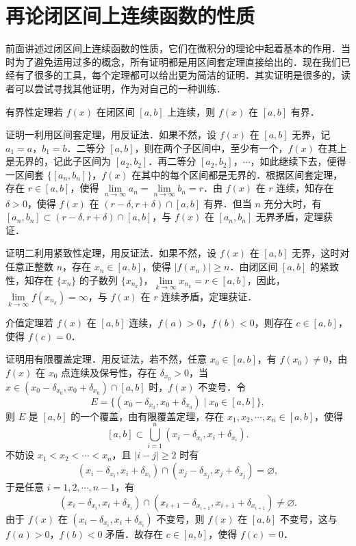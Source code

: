 \section{再论闭区间上连续函数的性质}

前面讲述过闭区间上连续函数的性质，它们在微积分的理论中起着基本的作用．当时为了避免运用过多的概念，所有证明都是用区间套定理直接给出的．现在我们已经有了很多的工具，每个定理都可以给出更为简洁的证明．其实证明是很多的，读者可以尝试寻找其他证明，作为对自己的一种训练．

{\thmheadfont 有界性定理}\quad 若 $f(x)$ 在闭区间 $[a, b]$ 上连续，则 $f(x)$ 在 $[a, b]$ 有界．

{\thmheadfont 证明一}\quad 利用区间套定理，用反证法．如果不然，设 $f(x)$ 在 $[a, b]$ 无界，记 $a_1 = a$，$b_1 = b$．二等分 $[a, b]$，则在两个子区间中，至少有一个，$f(x)$ 在其上是无界的，记此子区间为 $[a_2, b_2]$．再二等分 $[a_2, b_2]$，$\cdots$，如此继续下去，便得一区间套 $\{[a_n, b_n]\}$，$f(x)$ 在其中的每个区间都是无界的．根据区间套定理，存在 $r \in [a, b]$，使得 $\lim\limits_{n \to \infty} a_n = \lim\limits_{n \to \infty} b_n = r$．由 $f(x)$ 在 $r$ 连续，知存在 $\delta > 0$，使得 $f(x)$ 在 $(r - \delta, r + \delta) \cap [a, b]$ 有界．但当 $n$ 充分大时，有 $[a_n, b_n] \subset (r - \delta, r + \delta) \cap [a, b]$，与 $f(x)$ 在 $[a_n, b_n]$ 无界矛盾，定理获证．

{\thmheadfont 证明二}\quad 利用紧致性定理，用反证法．如果不然，设 $f(x)$ 在 $[a, b]$ 无界，这时对任意正整数 $n$，存在 $x_n \in [a, b]$，使得 $|f(x_n)| \geqslant n$．由闭区间 $[a, b]$ 的紧致性，知存在 $\{x_n\}$ 的子数列 $\{x_{n_k}\}$，$\lim\limits_{k \to \infty} x_{n_k} = r \in [a, b]$，因此，$\lim\limits_{k \to \infty} f(x_{n_k}) = \infty$，与 $f(x)$ 在 $r$ 连续矛盾，定理获证．

{\thmheadfont 介值定理}\quad 若 $f(x)$ 在 $[a, b]$ 连续，$f(a) > 0$，$f(b) < 0$，则存在 $c \in [a, b]$，使得 $f(c) = 0$．

{\thmheadfont 证明}\quad 用有限覆盖定理．用反证法，若不然，任意 $x_0 \in [a, b]$，有 $f(x_0) \neq 0$，由 $f(x)$ 在 $x_0$ 点连续及保号性，存在 $\delta_{x_0} > 0$，当 $x \in (x_0 - \delta_{x_0}, x_0 + \delta_{x_0}) \cap [a, b]$ 时，$f(x)$ 不变号．令
\[
E = \{ (x_0 - \delta_{x_0}, x_0 + \delta_{x_0}) \mid x_0 \in [a, b] \},
\]
则 $E$ 是 $[a, b]$ 的一个覆盖，由有限覆盖定理，存在 $x_1, x_2, \cdots, x_n \in [a, b]$，使得
\[
[a, b] \subset \bigcup_{i=1}^{n} (x_i - \delta_{x_i}, x_i + \delta_{x_i}).
\]
不妨设 $x_1 < x_2 < \cdots < x_n$，且 $|i - j| \geqslant 2$ 时有
\[
(x_i - \delta_{x_i}, x_i + \delta_{x_i}) \cap (x_j - \delta_{x_j}, x_j + \delta_{x_j}) = \varnothing,
\]
于是任意 $i = 1, 2, \cdots, n-1$，有
\[
(x_i - \delta_{x_i}, x_i + \delta_{x_i}) \cap (x_{i+1} - \delta_{x_{i+1}}, x_{i+1} + \delta_{x_{i+1}}) \neq \varnothing.
\]
由于 $f(x)$ 在 $(x_i - \delta_{x_i}, x_i + \delta_{x_i})$ 不变号，则 $f(x)$ 在 $[a, b]$ 不变号，这与 $f(a) > 0$，$f(b) < 0$ 矛盾．故存在 $c \in [a, b]$，使得 $f(c) = 0$．

